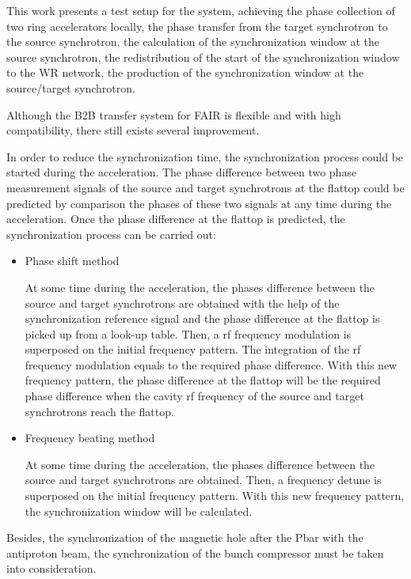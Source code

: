 This work presents a test setup for the system, achieving the phase collection of two ring accelerators locally, the phase transfer from the target synchrotron to the source synchrotron, the calculation of the synchronization window at the source synchrotron, the redistribution of the start of the synchronization window to the WR network, the production of the synchronization window at the source/target synchrotron. 

Although the B2B transfer system for FAIR is flexible and with high compatibility, there still exists several improvement. 

In order to reduce the synchronization time, the synchronization process could be started during the acceleration. The phase difference between two phase measurement signals of the source and target synchrotrons at the flattop could be predicted by comparison the phases of these two signals at any time during the acceleration. Once the phase difference at the flattop is predicted, the synchronization process can be carried out: 
\begin{itemize}
	\item Phase shift method

At some time during the acceleration, the phases difference between the source and target synchrotrons are obtained with the help of the synchronization reference signal and the phase difference at the flattop is picked up from a look-up table. Then, a rf frequency modulation is superposed on the initial frequency pattern. The integration of the rf frequency modulation equals to the required phase difference. With this new frequency pattern, the phase difference at the flattop will be the required phase difference when the cavity rf frequency of the source and target synchrotrons reach the flattop. 
	\item Frequency beating method

At some time during the acceleration, the phases difference between the source and target synchrotrons are obtained. Then, a frequency detune is superposed on the initial frequency pattern. With this new frequency pattern, the synchronization window will be calculated. 
\end{itemize}

Besides, the synchronization of the magnetic hole after the Pbar with the antiproton beam, the synchronization of the bunch compressor must be taken into consideration.
